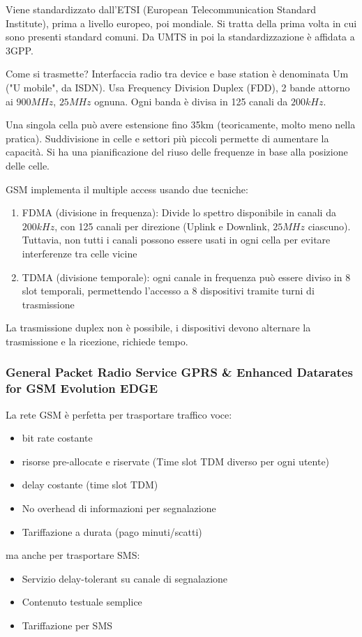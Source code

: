 Viene standardizzato dall'ETSI (European Telecommunication Standard Institute), prima a livello europeo, poi mondiale. Si tratta della prima volta in cui sono presenti standard comuni. Da UMTS in poi la standardizzazione è affidata a 3GPP.

Come si trasmette? Interfaccia radio tra device e base station è denominata Um ("U mobile", da ISDN). Usa Frequency Division Duplex (FDD), 2 bande attorno ai $900MHz$, $25MHz$ ognuna. Ogni banda è divisa in 125 canali da $200kHz$. 

Una singola cella può avere estensione fino 35km (teoricamente, molto meno nella pratica). Suddivisione in celle e settori più piccoli permette di aumentare la capacità. Si ha una pianificazione del riuso delle frequenze in base alla posizione delle celle.

GSM implementa il multiple access usando due tecniche: 
\begin{enumerate}
	\item FDMA (divisione in frequenza): Divide lo spettro disponibile in canali da $200 kHz$, con 125 canali per direzione (Uplink e Downlink, $25MHz$ ciascuno). Tuttavia, non tutti i canali possono essere usati in ogni cella per evitare interferenze tra celle vicine
	
    \item TDMA (divisione temporale): ogni canale in frequenza può essere diviso in 8 slot temporali, permettendo l'accesso a 8 dispositivi tramite turni di trasmissione
\end{enumerate}

La trasmissione duplex non è possibile, i dispositivi devono alternare la trasmissione e la ricezione, richiede tempo. 

\subsubsection{General Packet Radio Service GPRS \& Enhanced Datarates for GSM Evolution EDGE}

La rete GSM è perfetta per trasportare traffico voce: 
\begin{itemize}
	\item bit rate costante

	\item risorse pre-allocate e riservate (Time slot TDM diverso per ogni utente)

	\item delay costante (time slot TDM)

	\item No overhead di informazioni per segnalazione

	\item Tariffazione a durata (pago minuti/scatti)
\end{itemize}
ma anche per trasportare SMS:
\begin{itemize}
	\item Servizio delay-tolerant su canale di segnalazione

	\item Contenuto testuale semplice

	\item Tariffazione per SMS
\end{itemize}

